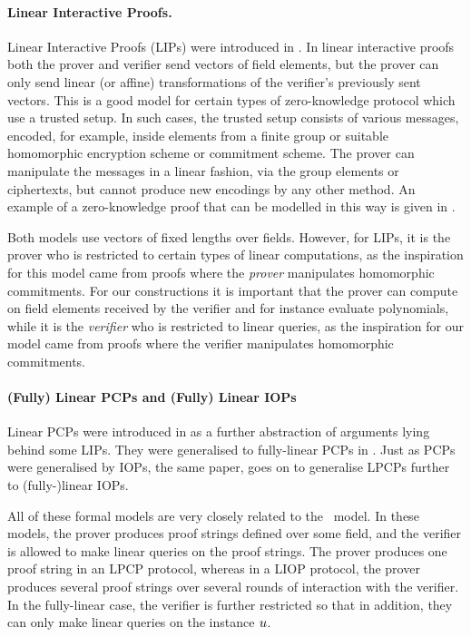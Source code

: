 \paragraph{Linear Interactive Proofs.} Linear Interactive Proofs  (LIPs) were introduced in \cite{BitanskyCIPO13}. In linear interactive proofs both the prover and verifier send vectors of field elements, but the prover can only send linear (or affine) transformations of the verifier's previously sent vectors. This is a good model for certain types of zero-knowledge protocol which use a trusted setup. In such cases, the trusted setup consists of various messages, encoded, for example, inside elements from a finite group or suitable homomorphic encryption scheme or commitment scheme. The prover can manipulate the messages in a linear fashion, via the group elements or ciphertexts, but cannot produce new encodings by any other method. An example of a zero-knowledge proof that can be modelled in this way is given in \cite{Gennaro2013}.

Both models use vectors of fixed lengths over fields. However, for LIPs, it is the prover who is restricted to certain types of linear computations, as the inspiration for this model came from proofs where the \emph{prover} manipulates homomorphic commitments. For our constructions it is important that the prover can compute on field elements received by the verifier and for instance evaluate polynomials, while it is the \emph{verifier} who is restricted to linear queries, as the inspiration for our model came from proofs where the verifier manipulates homomorphic commitments.

\paragraph{(Fully) Linear PCPs and (Fully) Linear IOPs}

Linear PCPs were introduced in \cite{BitanskyCIPO13} as a further abstraction of arguments lying behind some LIPs. They were generalised to fully-linear PCPs in \cite{BonehBCGI19}. Just as PCPs were generalised by IOPs, the same paper, \cite{BonehBCGI19} goes on to generalise LPCPs further to (fully-)linear IOPs.

All of these formal models are very closely related to the \ILC\ model. In these models, the prover produces proof strings defined over some field, and the verifier is allowed to make linear queries on the proof strings. The prover produces one proof string in an LPCP protocol, whereas in a LIOP protocol, the prover produces several proof strings over several rounds of interaction with the verifier. In the fully-linear case, the verifier is further restricted so that in addition, they can only make linear queries on the instance $u$.

